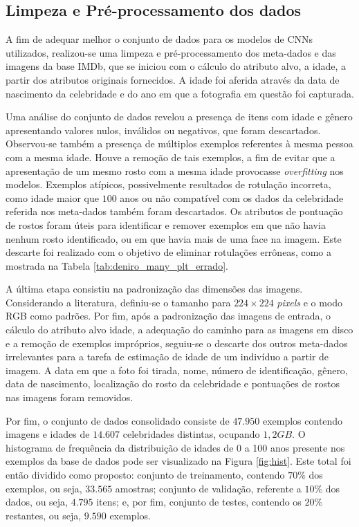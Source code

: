 \subsection{Limpeza e Pré-processamento dos dados}

A fim de adequar melhor o conjunto de dados para os modelos de CNNs utilizados, realizou-se uma limpeza e pré-processamento dos meta-dados e das imagens da base IMDb, que se iniciou com o cálculo do atributo alvo, a idade, a partir dos atributos originais fornecidos. A idade foi aferida através da data de nascimento da celebridade e do ano em que a fotografia em questão foi capturada.

Uma análise do conjunto de dados revelou a presença de itens com idade e gênero apresentando valores nulos, inválidos ou negativos, que foram descartados. Observou-se também a presença de múltiplos exemplos referentes à mesma pessoa com a mesma idade. Houve a remoção de tais exemplos, a fim de evitar que a apresentação de um mesmo rosto com a mesma idade provocasse \emph{overfitting} nos modelos. Exemplos atípicos, possivelmente resultados de rotulação incorreta, como idade maior que $100$ anos ou não compatível com os dados da celebridade referida nos meta-dados também foram descartados. Os atributos de pontuação de rostos foram úteis para identificar e remover exemplos em que não havia nenhum rosto identificado, ou em que havia mais de uma face na imagem. Este descarte foi realizado com o objetivo de eliminar rotulações errôneas, como a mostrada na Tabela \ref{tab:deniro_many_plt_errado}.

A última etapa consistiu na padronização das dimensões das imagens. Considerando a literatura, definiu-se o tamanho para $224 \times 224$ \emph{pixels} e o modo RGB como padrões. Por fim, após a padronização das imagens de entrada, o cálculo do atributo alvo idade, a adequação do caminho para as imagens em disco e a remoção de exemplos impróprios, seguiu-se o descarte dos outros meta-dados irrelevantes para a tarefa de estimação de idade de um indivíduo a partir de imagem. A data em que a foto foi tirada, nome, número de identificação, gênero, data de nascimento, localização do rosto da celebridade e pontuações de rostos nas imagens foram removidos.

Por fim, o conjunto de dados consolidado consiste de $47.950$ exemplos contendo imagens e idades de $14.607$ celebridades distintas, ocupando $1,2 GB$. O histograma de frequência da distribuição de idades de 0 a 100 anos presente nos exemplos da base de dados pode ser visualizado na Figura \ref{fig:hist}. Este total foi então dividido como proposto: conjunto de treinamento, contendo $70\%$ dos exemplos, ou seja, $33.565$ amostras; conjunto de validação, referente a $10\%$ dos dados, ou seja, $4.795$ itens; e, por fim, conjunto de testes, contendo os $20\%$ restantes, ou seja, $9.590$ exemplos.


